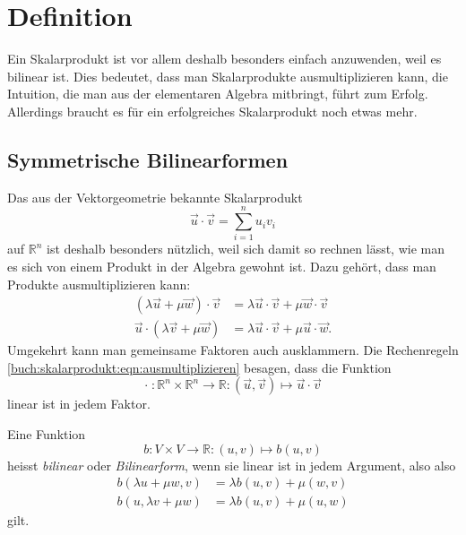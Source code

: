 %
%
%
\section{Definition
\label{buch:skalarprodukte:section:definition}}
Ein Skalarprodukt ist vor allem deshalb besonders einfach anzuwenden,
weil es bilinear ist.
Dies bedeutet, dass man Skalarprodukte ausmultiplizieren kann, die
Intuition, die man aus der elementaren Algebra mitbringt, führt zum
Erfolg.
Allerdings braucht es für ein erfolgreiches Skalarprodukt noch
etwas mehr.

%
%
\subsection{Symmetrische Bilinearformen}
Das aus der Vektorgeometrie bekannte Skalarprodukt
%
%
\[
\vec{u}\cdot \vec{v}
=
\sum_{i=1}^n u_iv_i
\]
auf $\mathbb{R}^n$ ist deshalb besonders nützlich, weil sich damit
so rechnen lässt, wie man es sich von einem Produkt in der Algebra
gewohnt ist.
Dazu gehört, dass man Produkte ausmultiplizieren kann:
\begin{equation}
\begin{aligned}
(\lambda\vec{u}+\mu\vec{w})\cdot\vec{v}
&=
\lambda\vec{u}\cdot\vec{v}+\mu\vec{w}\cdot\vec{v}
\\
\vec{u}\cdot(\lambda\vec{v}+\mu\vec{w})
&=
\lambda\vec{u}\cdot\vec{v}+\mu\vec{u}\cdot\vec{w}.
\end{aligned}
\label{buch:skalarprodukt:eqn:ausmultiplizieren}
\end{equation}
Umgekehrt kann man gemeinsame Faktoren auch ausklammern.
Die Rechenregeln \eqref{buch:skalarprodukt:eqn:ausmultiplizieren}
besagen, dass die Funktion
\[
\cdot
\;
\colon
\mathbb{R}^n \times \mathbb{R}^n
\to
\mathbb{R}
:
(\vec{u},\vec{v}) \mapsto \vec{u}\cdot\vec{v}
\]
linear ist in jedem Faktor.

\begin{definition}
Eine Funktion
\[
b\colon
V\times V \to \mathbb{R}
:
(u,v) \mapsto b(u,v)
\]
heisst {\em bilinear} oder {\em Bilinearform},
wenn sie linear ist in jedem Argument, also also
%
%
\[
\begin{aligned}
b(\lambda u+\mu w,v) &= \lambda b(u,v) + \mu(w,v)
\\
b(u,\lambda v+\mu w) &= \lambda b(u,v) + \mu(u,w)
\end{aligned}
\]
gilt.
\end{definition}

